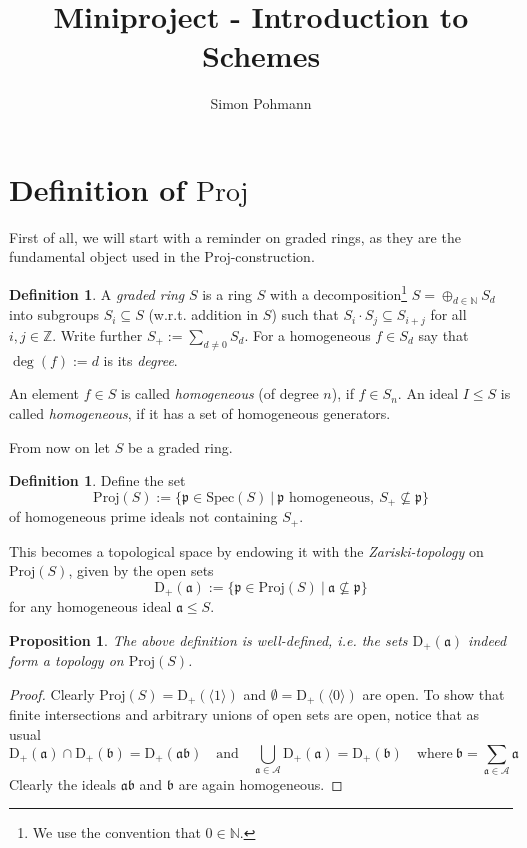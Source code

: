 \documentclass{scrartcl}
\title{Miniproject - Introduction to Schemes}
\author{Simon Pohmann}
\newcommand{\N}{\mathbb{N}}
\newcommand{\Z}{\mathbb{Z}}
\newcommand{\D}[1]{\mathrm{D}_+(#1)}
\newcommand{\p}{\mathfrak{p}}
\renewcommand{\a}{\mathfrak{a}}
\renewcommand{\b}{\mathfrak{b}}
\newcommand{\Spec}{\mathrm{Spec}}
\newcommand{\Proj}{\mathrm{Proj}}
\newtheorem{prop}[subsection]{Proposition}
\theoremstyle{definition}
\newtheorem{definition}[subsection]{Definition}
\begin{document}
\maketitle

\tableofcontents

\section{Definition of $\Proj$}

First of all, we will start with a reminder on graded rings, as they are the fundamental object used in the $\Proj$-construction.
\begin{definition}
    A \emph{graded ring} $S$ is a ring $S$ with a decomposition\footnote{We use the convention that $0 \in \N$.} $S = \oplus_{d \in \N} S_d$ into subgroups $S_i \subseteq S$ (w.r.t. addition in $S$) such that $S_i \cdot S_j \subseteq S_{i + j}$ for all $i, j \in \Z$.
    Write further $S_+ := \sum_{d \neq 0} S_d$.
    For a homogeneous $f \in S_d$ say that $\deg(f) := d$ is its \emph{degree}.

    An element $f \in S$ is called \emph{homogeneous} (of degree $n$), if $f \in S_n$.
    An ideal $I \leq S$ is called \emph{homogeneous}, if it has a set of homogeneous generators.
\end{definition}
From now on let $S$ be a graded ring.
\begin{definition}
    Define the set
    \begin{equation*}
        \Proj(S) := \{ \p \in \Spec(S) \ | \ \text{$\p$ homogeneous}, \ S_+ \not\subseteq \p \}
    \end{equation*}
    of homogeneous prime ideals not containing $S_+$.

    This becomes a topological space by endowing it with the \emph{Zariski-topology} on $\Proj(S)$, given by the open sets
    \begin{equation*}
        \D{\a} := \{ \p \in \Proj(S) \ | \ \a \not\subseteq \p \}
    \end{equation*}
    for any homogeneous ideal $\a \leq S$.
\end{definition}
\begin{prop}
    The above definition is well-defined, i.e. the sets $\D{\a}$ indeed form a topology on $\Proj(S)$.
\end{prop}
\begin{proof}
    Clearly $\Proj(S) = \D{\langle 1 \rangle}$ and $\emptyset = \D{\langle 0 \rangle}$ are open.
    To show that finite intersections and arbitrary unions of open sets are open, notice that as usual
    \begin{equation*}
        \D{\a} \cap \D{\b} = \D{\a\b} \quad \text{and} \quad \bigcup_{\a \in \mathcal{A}} \D{\a} = \D{\b} \quad \text{where} \ \b = \sum_{\a \in \mathcal{A}} \a
    \end{equation*}
    Clearly the ideals $\a\b$ and $\b$ are again homogeneous.
\end{proof}
\end{document}
